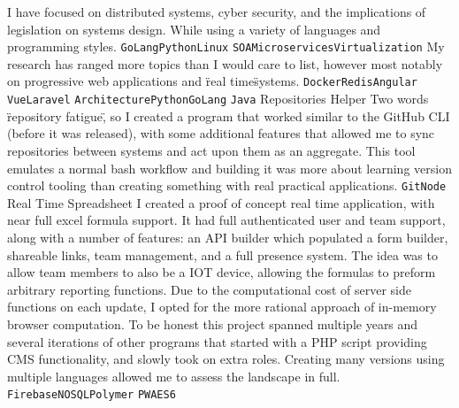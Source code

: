 \documentclass[9pt]{developercv} %
\begin{document}
\begin{entrylist}
    {
        I have focused on distributed systems, cyber security, and the
        implications of legislation on systems design. While using a variety of
        languages and programming styles.
        \texttt{GoLang}\slashsep\texttt{Python}\slashsep\texttt{Linux}
        \slashsep\texttt{SOA}\slashsep\texttt{Microservices}\slashsep\texttt{Virtualization}
    }
    {
        My research has ranged more topics than I would care to list, however
        most notably on progressive web applications and \"real time\" systems.
        \texttt{Docker}\slashsep\texttt{Redis}\slashsep\texttt{Angular}
        \slashsep\texttt{Vue}\slashsep\texttt{Laravel}\slashsep
        \texttt{Architecture}\slashsep\texttt{Python}\slashsep\texttt{GoLang}
        \slashsep\texttt{Java}
    }
     {Repositories Helper} {}
    {
        Two words \"repository fatigue\", so I created a program that worked
        similar to the GitHub CLI (before it was released), with some additional
        features that allowed me to sync repositories between systems and act
        upon them as an aggregate. This tool emulates a normal bash workflow and
        building it was more about learning version control tooling than creating
        something with real practical applications.
        \texttt{Git}\slashsep\texttt{Node}
    }
     {Real Time Spreadsheet} {}
    {
        I created a proof of concept real time application, with near full excel
        formula support. It had full authenticated user and team support, along
        with a number of features: an API builder which populated a form builder,
        shareable links, team management, and a full presence system. The idea
        was to allow team members to also be a IOT device, allowing the formulas
        to preform arbitrary reporting functions. Due to the computational cost
        of server side functions on each update, I opted for the more rational
        approach of in-memory browser computation. To be honest this project
        spanned multiple years and several iterations of other programs that
        started with a PHP script providing CMS functionality, and slowly took on
        extra roles. Creating many versions using multiple languages allowed me to
        assess the landscape in full.
        \texttt{Firebase}\slashsep\texttt{NOSQL}\slashsep\texttt{Polymer}\slashsep
        \texttt{PWA}\slashsep\texttt{ES6}
    }
\end{entrylist}



\vspace{1cm}

\cvfooter
\end{document}
